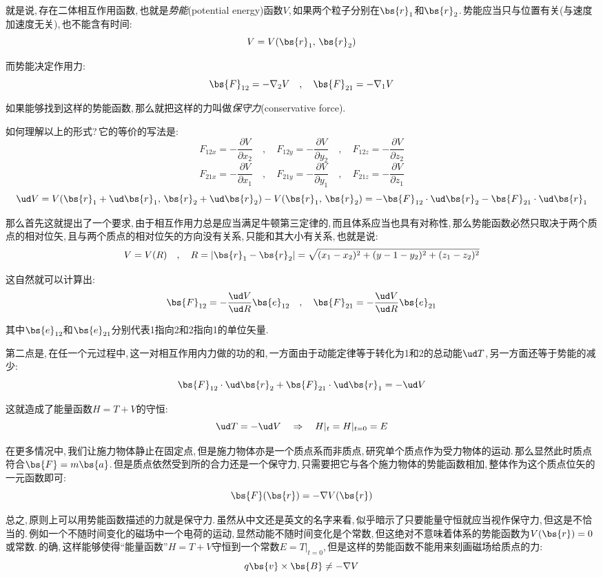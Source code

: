 就是说,\,存在二体相互作用函数,\,也就是\emph{势能}(potential energy)函数$V$,\,如果两个粒子分别在$\bs{r}_1$和$\bs{r}_2$.\,势能应当只与位置有关(与速度加速度无关),\,也不能含有时间:
\[V=V(\bs{r}_1,\,\bs{r}_2)\]

而势能决定作用力:
\[\bs{F}_{12}=-\nabla_2V\quad,\quad\bs{F}_{21}=-\nabla_1V\]

如果能够找到这样的势能函数,\,那么就把这样的力叫做\emph{保守力}(conservative force).

如何理解以上的形式?\,它的等价的写法是:
\[F_{12x}=-\frac{\partial V}{\partial x_2}\quad ,\quad F_{12y}=-\frac{\partial V}{\partial y_2}\quad ,\quad F_{12z}=-\frac{\partial V}{\partial z_2}\]
\[F_{21x}=-\frac{\partial V}{\partial x_1}\quad ,\quad F_{21y}=-\frac{\partial V}{\partial y_1}\quad ,\quad F_{21z}=-\frac{\partial V}{\partial z_1}\]
\[\ud V=V(\bs{r}_1+\ud \bs{r}_1,\,\bs{r}_2+\ud \bs{r}_2)-V(\bs{r}_1,\,\bs{r}_2)=-\bs{F}_{12}\cdot \ud \bs{r}_2-\bs{F}_{21}\cdot \ud \bs{r}_1\]

那么首先这就提出了一个要求,\,由于相互作用力总是应当满足牛顿第三定律的,\,而且体系应当也具有对称性,\,那么势能函数必然只取决于两个质点的相对位矢,\,且与两个质点的相对位矢的方向没有关系,\,只能和其大小有关系,\,也就是说:
\[V=V(R)\quad,\quad R=|\bs{r}_1-\bs{r}_2|=\sqrt{(x_1-x_2)^2+(y-1-y_2)^2+(z_1-z_2)^2}\]

这自然就可以计算出:
\[\bs{F}_{12}=-\frac{\ud V}{\ud R}\bs{e}_{12}\quad ,\quad \bs{F}_{21}=-\frac{\ud V}{\ud R}\bs{e}_{21}\]

其中$\bs{e}_{12}$和$\bs{e}_{21}$分别代表1指向2和2指向1的单位矢量.

第二点是,\,在任一个元过程中,\,这一对相互作用内力做的功的和,\,一方面由于动能定律等于转化为1和2的总动能$\ud T$,\,另一方面还等于势能的减少:
\[\bs{F}_{12}\cdot \ud \bs{r}_2+\bs{F}_{21}\cdot \ud \bs{r}_1=-\ud V\]

这就造成了能量函数$H=T+V$的守恒:
\[\ud T=-\ud V\quad \Rightarrow \quad H|_t=H|_{t=0}=E\]

在更多情况中,\,我们让施力物体静止在固定点,\,但是施力物体亦是一个质点系而非质点,\,研究单个质点作为受力物体的运动.\,那么显然此时质点符合$\bs{F}=m\bs{a}$.\,但是质点依然受到所的合力还是一个保守力,\,只需要把它与各个施力物体的势能函数相加,\,整体作为这个质点位矢的一元函数即可:
\[\bs{F}(\bs{r})=-\nabla V(\bs{r})\]

总之,\,原则上可以用势能函数描述的力就是保守力.\,虽然从中文还是英文的名字来看,\,似乎暗示了只要能量守恒就应当视作保守力,\,但这是不恰当的.\,例如一个不随时间变化的磁场中一个电荷的运动,\,显然动能不随时间变化是个常数,\,但这绝对不意味着体系的势能函数为$V(\bs{r})=0$或常数.\,的确,\,这样能够使得``能量函数''$H=T+V$守恒到一个常数$E=T|_{t=0}$,\,但是这样的势能函数不能用来刻画磁场给质点的力:
\[q\bs{v}\times \bs{B}\neq -\nabla V\]

